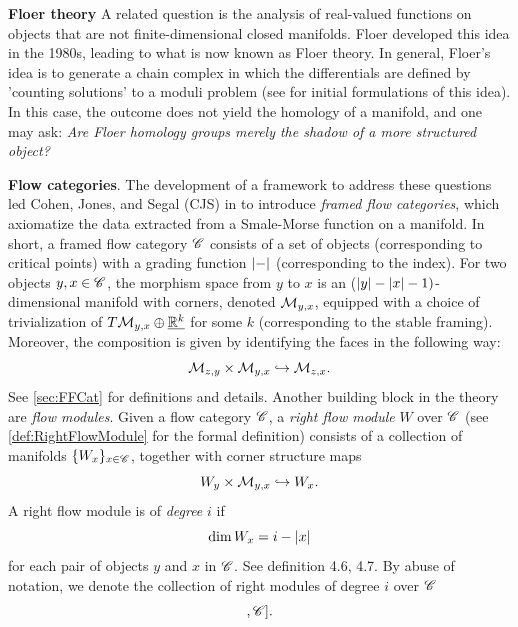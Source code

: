 \textbf{Floer theory} A related question is the analysis of real-valued functions on objects that are not finite-dimensional closed manifolds. Floer developed this idea in the 1980s, leading to what is now known as Floer theory.
In general, Floer's idea is to generate a chain complex in which the differentials are defined by 'counting solutions' to a moduli problem (see \cite{floer1987morse} for initial formulations of this idea). In this case, the outcome does not yield the homology of a manifold, and one may ask: \textit{Are Floer homology groups merely the shadow of a more structured object?}

\textbf{Flow categories}. The development of a framework to address these questions led Cohen, Jones, and Segal (CJS) in \cite{CJS95} to introduce \emph{framed flow categories}, which axiomatize the data extracted from a Smale-Morse function on a manifold. In short, a framed flow category $\mathscr{C}$ consists of a set of objects (corresponding to critical points) with a grading function $\left\lvert-\right\rvert$ (corresponding to the index). For two objects $y,x \in \mathscr{C}$, the morphism space from $y$ to $x$ is an ($\left\lvert y\right\rvert-\left\lvert x\right\rvert-1)$-dimensional manifold with corners, denoted $\mathcal{M}_{y,x}$, equipped with a choice of trivialization of $T\mathcal{M}_{y,x} \oplus \underline{\mathbb{R}^k}$ for some $k$ (corresponding to the stable framing).
Moreover, the composition is given by identifying the faces in the following way:
\begin{equation*}
    \mathcal{M}_{z,y} \times \mathcal{M}_{y,x} \hookrightarrow \mathcal{M}_{z,x}.
\end{equation*}
See \cref{sec:FFCat} for definitions and details. Another building block in the theory are \emph{flow modules}. Given a flow category $\mathscr{C}$, a \emph{right flow module} $W$ over $\mathscr{C}$ (see \cref{def:RightFlowModule} for the formal definition) consists of a collection of manifolds $\{W_x\}_{x\in \mathscr{C}}$, together with corner structure maps \begin{equation*}
    W_y \times \mathcal{M}_{y,x} \hookrightarrow W_x.
\end{equation*}
A right flow module is of \emph{degree} $i$ if 
\begin{equation*}
    \dim W_x = i - \left\lvert x\right\rvert
\end{equation*}
for each pair of objects $y$ and $x$ in $\mathscr{C}$. See \cite{porcelli2024bordism} definition 4.6, 4.7.
By abuse of notation, we denote the collection of right modules of degree $i$ over $\mathscr{C}$ 
\begin{equation*}
    [*[i],\fC].
\end{equation*}
